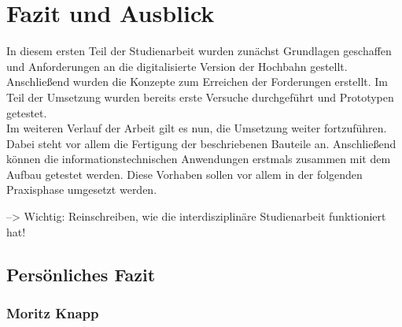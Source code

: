 %
%
%
%
%
%
%
%
%	




\chapter{Fazit und Ausblick}
In diesem ersten Teil der Studienarbeit wurden zunächst Grundlagen geschaffen und Anforderungen an die digitalisierte Version der Hochbahn gestellt. Anschließend wurden die Konzepte zum Erreichen der Forderungen erstellt. Im Teil der Umsetzung wurden bereits erste Versuche durchgeführt und Prototypen getestet.\\

Im weiteren Verlauf der Arbeit gilt es nun, die Umsetzung weiter fortzuführen. Dabei steht vor allem die Fertigung der beschriebenen Bauteile an. Anschließend können die informationstechnischen Anwendungen erstmals zusammen mit dem Aufbau getestet werden. Diese Vorhaben sollen vor allem in der folgenden Praxisphase umgesetzt werden. 

--> Wichtig: Reinschreiben, wie die interdisziplinäre Studienarbeit funktioniert hat!

\section{Persönliches Fazit}

\subsection{Moritz Knapp}
